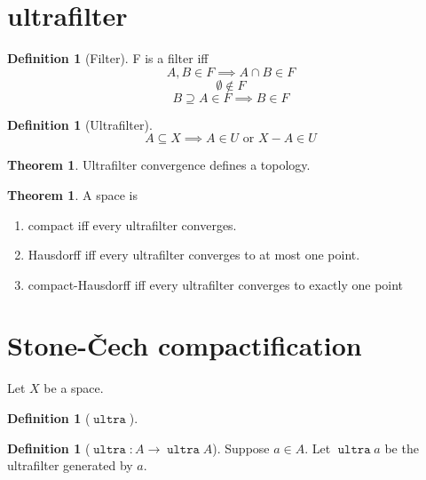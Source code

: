 \documentclass[10pt]{scrartcl}
\newcounter{thms}
\numberwithin{thms}{section}
\theoremstyle{definition}
\newtheorem{defn}[thms]{Definition}
\newtheorem{theorem}[thms]{Theorem}
\newcommand{\ultra}{\operatorname{\mathtt{ultra}}}
\begin{document}
\section{ultrafilter}
\begin{defn}[Filter]
  F is a filter iff
  \label{defn:filter}
  \begin{equation}
    \label{eq:filter-ax:finite-int}
    A,B\in F \implies A\cap B \in F
  \end{equation}
  \begin{equation}
    \label{eq:filter-ax:proper}
    \emptyset \notin F
  \end{equation}
  \begin{equation}
    \label{eq:filter-ax:upward-closed}
    B\supseteq A\in F \implies B\in F
  \end{equation}
\end{defn}

\begin{defn}[Ultrafilter]
  \begin{equation}
    \label{eq:ultra-ax}
    A\subseteq X \implies A \in U \textrm{ or } X-A\in U   
  \end{equation}
\end{defn}

\begin{theorem}
  Ultrafilter convergence defines a topology. 
\end{theorem}
\begin{theorem}
  A space is
  \begin{enumerate}
  \item compact iff every ultrafilter converges.
  \item Hausdorff iff every ultrafilter converges to at most one point.
  \item compact-Hausdorff iff every ultrafilter converges to exactly one
    point
  \end{enumerate}
\end{theorem}

\section{Stone-Čech compactification}
Let $X$ be a space. 
\begin{defn}[$\ultra$]

\end{defn}

\begin{defn}[$\ultra:A \to \ultra A$]
  Suppose $a\in A$. Let $\ultra a$ be the ultrafilter generated by $a$. 
\end{defn}
\end{document}
